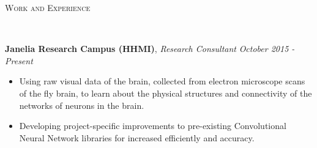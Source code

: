 \documentclass[9pt]{article}
\newenvironment{changemargin}[2]{%
  \begin{list}{}{%
    \setlength{\topsep}{0pt}%
    \setlength{\leftmargin}{#1}%
    \setlength{\rightmargin}{#2}%
    \setlength{\listparindent}{\parindent}%
    \setlength{\itemindent}{\parindent}%
    \setlength{\parsep}{\parskip}%
  }%
  \item[]}{\end{list}
}
\newcommand{\lineover}{
	\begin{changemargin}{-0.05in}{-0.05in}
		\vspace*{-8pt}
		\hrulefill \\
		\vspace*{-2pt}
	\end{changemargin}
}
\newcommand{\header}[1]{
	\begin{changemargin}{-0.5in}{-0.5in}
		\scshape{#1}\\
  	\lineover
	\end{changemargin}
}
\newenvironment{body} {
	\vspace*{-16pt}
	\begin{changemargin}{-0.25in}{-0.5in}
  }	
	{\end{changemargin}
}
\begin{document}
\header{Work and Experience}
\begin{body}
	\vspace{18pt}
	\textbf{Janelia Research Campus (HHMI)}, \emph{Research Consultant} \hfill \emph{October 2015 - Present}\\
	\vspace*{-3pt}
	\begin{itemize} \itemsep -0pt %
	\item Using raw visual data of the brain, collected from electron microscope scans of the fly brain, to learn about the physical structures and connectivity of the networks of neurons in the brain.
	\item Developing project-specific improvements to pre-existing Convolutional Neural Network libraries for increased efficiently and accuracy.
	\end{itemize}
	

\end{body}
\end{document}
